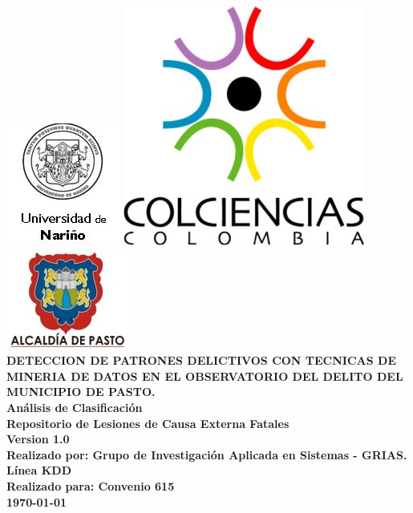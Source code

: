 \documentclass{article}
\begin{document}
\pagestyle{empty}
\hypersetup{pageanchor=false}
\begin{titlepage}
  \centering
  \vspace*{3\baselineskip}
  \includegraphics[scale=0.42]{udenar.jpg}\hspace{2cm}
  \includegraphics[scale=0.85]{colciencias.jpg}\hspace{2cm}
  \includegraphics[scale=1.2]{alcaldia.jpg} 
  \\ \vspace*{4\baselineskip}
  \large
  \bfseries
DETECCION DE PATRONES DELICTIVOS CON TECNICAS DE MINERIA DE DATOS EN EL OBSERVATORIO DEL DELITO DEL MUNICIPIO DE PASTO. \\ [5\baselineskip]
  \normalfont
  Análisis de Clasificación \\
  Repositorio de Lesiones de Causa Externa Fatales \\
  Version 1.0 \\ [5\baselineskip]
  Realizado por: Grupo de Investigación Aplicada en Sistemas - GRIAS. Línea KDD \\
  Realizado para:  Convenio 615 \\ [5\baselineskip]
  
  \textbf{\today} \\[2\baselineskip]    
\end{titlepage}
\end{document}
